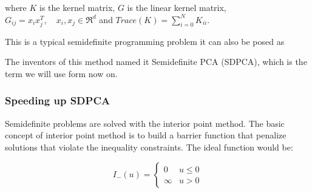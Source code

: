\documentclass[12pt,letterpaper,doublespaced,ETD,dvips,proposal]{gtthesis}
\begin{document}
\begin{Body}
\vspace{1cm}

where $K$ is the kernel matrix, $G$ is the linear kernel matrix,
$G_{ij}=x_i x_j^T,\quad x_i,x_j\in \Re^d$ and
$Trace(K)=\sum_{i=0}^{N}K_{ii}$.

This is a typical semidefinite programming problem it can also be
posed as


\vspace{1cm}

The inventors of this method named it Semidefinite PCA (SDPCA),
which is the term we will use form now on.

\subsubsection{Speeding up SDPCA}
Semidefinite problems are solved with the interior point method. The
basic concept of interior point method is to build a barrier
function that penalize solutions that violate the inequality
constraints. The ideal function would be:

\begin{equation}
I_{-}(u)= \left\{
               \begin{array}{cc}
                 0    & u\leq 0 \\
                 \infty & u>0
                \end{array}
          \right.
\end{equation}



\end{Body}
\end{document}
